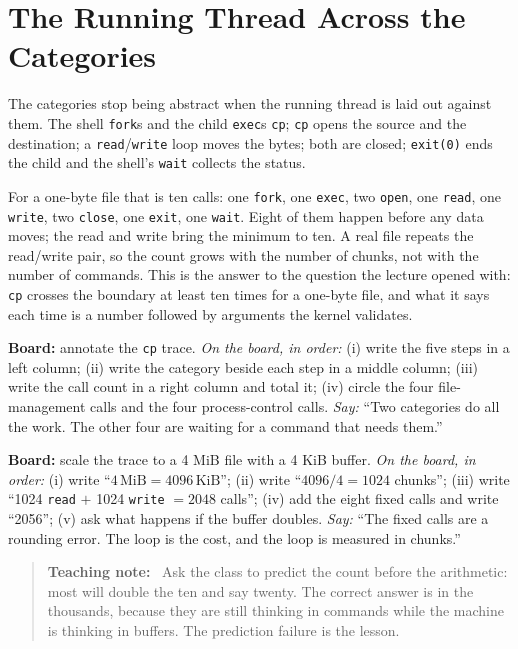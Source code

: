 \documentclass[11pt]{article}
\newenvironment{teachingaside}{\begin{quote}\small\color{primary-gold}\textbf{Teaching note:}\ }{\end{quote}}
\begin{document}
\section{The Running Thread Across the Categories}

The categories stop being abstract when the running thread is laid out against them. The shell \texttt{fork}s and the child \texttt{exec}s \texttt{cp}; \texttt{cp} opens the source and the destination; a \texttt{read}/\texttt{write} loop moves the bytes; both are closed; \texttt{exit(0)} ends the child and the shell's \texttt{wait} collects the status.

For a one-byte file that is ten calls: one \texttt{fork}, one \texttt{exec}, two \texttt{open}, one \texttt{read}, one \texttt{write}, two \texttt{close}, one \texttt{exit}, one \texttt{wait}. Eight of them happen before any data moves; the read and write bring the minimum to ten. A real file repeats the read/write pair, so the count grows with the number of chunks, not with the number of commands. This is the answer to the question the lecture opened with: \texttt{cp} crosses the boundary at least ten times for a one-byte file, and what it says each time is a number followed by arguments the kernel validates.

\textbf{Board:} annotate the \texttt{cp} trace. \emph{On the board, in order:} (i) write the five steps in a left column; (ii) write the category beside each step in a middle column; (iii) write the call count in a right column and total it; (iv) circle the four file-management calls and the four process-control calls. \emph{Say:} ``Two categories do all the work. The other four are waiting for a command that needs them.''

\textbf{Board:} scale the trace to a 4 MiB file with a 4 KiB buffer. \emph{On the board, in order:} (i) write ``$4\,\text{MiB} = 4096\,\text{KiB}$''; (ii) write ``$4096 / 4 = 1024$ chunks''; (iii) write ``1024 \texttt{read} $+$ 1024 \texttt{write} $= 2048$ calls''; (iv) add the eight fixed calls and write ``2056''; (v) ask what happens if the buffer doubles. \emph{Say:} ``The fixed calls are a rounding error. The loop is the cost, and the loop is measured in chunks.''

\begin{teachingaside}
Ask the class to predict the count before the arithmetic: most will double the ten and say twenty. The correct answer is in the thousands, because they are still thinking in commands while the machine is thinking in buffers. The prediction failure is the lesson.
\end{teachingaside}
\end{document}
